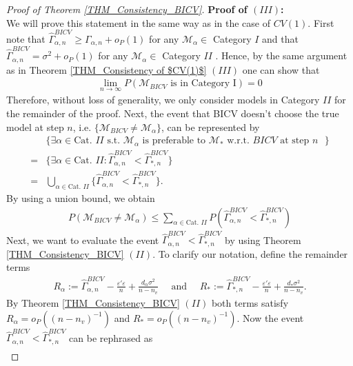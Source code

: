 \documentclass[Research_Module_ES.tex]{subfiles}
\begin{document}
\begin{proof}[Proof of Theorem \ref{THM_Consistency_BICV}]
	\textbf{Proof of $(III)$:} \\
	We will prove this statement in the same way as in the case of $CV(1)$. 
	First note that $\hat{\Gamma}_{\alpha,n}^{BICV} \ge \Gamma_{\alpha,n}+o_P(1)$ for any $\mathcal{M}_\alpha \in $ Category $I$ and that $\hat{\Gamma}_{\alpha,n}^{BICV} = \sigma^2+o_P(1)$ for any $\mathcal{M}_\alpha \in $ Category $II$ . 
	Hence, by the same argument as in Theorem \ref{THM_Consistency of $CV(1)$} $(III)$ one can show that 
	\begin{align*}
	\lim_{n\to\infty} P(\mathcal{M}_{BICV}\textrm{ is in Category I})=0
	\end{align*}
	Therefore, without loss of generality, we only consider models in Category $II$ for the remainder of the proof.
	Next, the event that BICV doesn't choose the true model at step $n$, i.e. $\{ \mathcal{M}_{BICV}\neq \mathcal{M}_\alpha\}$, can be represented by
	\begin{align*}
	&\{ \exists\alpha\in \textrm{Cat. $II$} \textrm{ s.t. $\mathcal{M}_\alpha$ is preferable to $\mathcal{M}_\ast$ w.r.t. $BICV$ at step $n$ }\} \\
	= &\{ \exists\alpha\in \textrm{Cat. $II$}: \hat{\Gamma}_{\alpha,n}^{BICV} < \hat{\Gamma}_{\ast,n}^{BICV} \} \\
	= &\underset{\alpha\in \textrm{Cat. $II$}}{\bigcup}\{\hat{\Gamma}_{\alpha,n}^{BICV} < \hat{\Gamma}_{\ast,n}^{BICV} \}.
\end{align*}
	By using a union bound, we obtain
	\begin{align*}
	P(\mathcal{M}_{BICV}\neq \mathcal{M}_\alpha) \le \sum_{\alpha\in \textrm{Cat. $II$}}P\left(\hat{\Gamma}_{\alpha,n}^{BICV} < \hat{\Gamma}_{\ast,n}^{BICV}\right)
	\end{align*}
	Next, we want to evaluate the event $\hat{\Gamma}_{\alpha,n}^{BICV} < \hat{\Gamma}_{\ast,n}^{BICV}$ by using Theorem \ref{THM_Consistency_BICV} $(II)$. To clarify our notation, define the remainder terms
	\begin{align*}
	R_\alpha := \hat{\Gamma}_{\alpha,n}^{BICV} - \frac{\varepsilon'\varepsilon}{n}+\frac{d_\alpha\sigma^2}{n-n_v}
	\quad \textrm{ and } \quad
	R_\ast := \hat{\Gamma}_{\ast,n}^{BICV} - \frac{\varepsilon'\varepsilon}{n}+\frac{d_\ast\sigma^2}{n-n_v}.
	\end{align*}
	By Theorem \ref{THM_Consistency_BICV} $(II)$ both terms satisfy $R_\alpha=o_P((n-n_v)^{-1})$ and $R_\ast=o_P((n-n_v)^{-1})$. Now the event $\hat{\Gamma}_{\alpha,n}^{BICV} < \hat{\Gamma}_{\ast,n}^{BICV}$ can be rephrased as
	\begin{align*}

\end{align*}
\end{proof}
\end{document}
